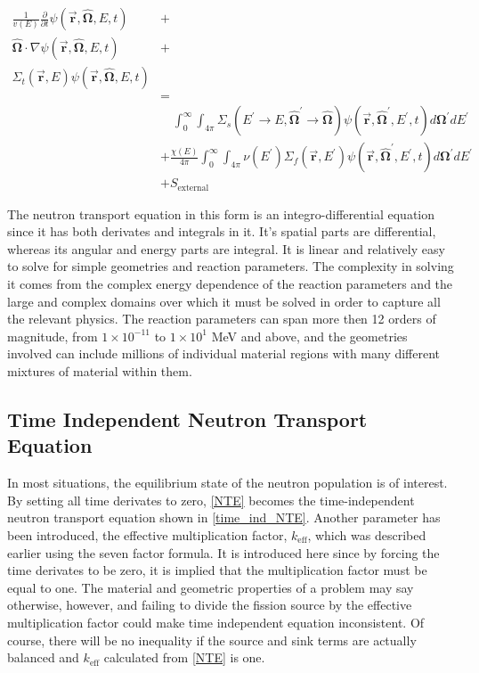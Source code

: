 \begin{equation}
\label{NTE}
\begin{split}
\frac{1}{v(E)} \frac{\partial }{\partial t}\psi(\boldsymbol{\vec{r}},\boldsymbol{\hat{\Omega}},E,t) &+  \\
\boldsymbol{\hat{\Omega}}  \cdot \nabla \psi(\boldsymbol{\vec{r}},\boldsymbol{\hat{\Omega}},E,t) &+ \\
\Sigma_t(\boldsymbol{\vec{r}},E) \psi(\boldsymbol{\vec{r}},\boldsymbol{\hat{\Omega}},E,t) & \\
& =  \\
& \quad \int_0^\infty  \int_{4\pi} \Sigma_s(E^\prime \rightarrow E,\boldsymbol{\hat{\Omega}}^\prime \rightarrow \boldsymbol{\hat{\Omega}}) \psi(\boldsymbol{\vec{r}},\boldsymbol{\hat{\Omega}}^\prime,E^\prime,t) d\boldsymbol{\Omega}^\prime dE^\prime  \\
&+ \frac{\chi(E)}{4\pi} \int_0^\infty  \int_{4\pi}   \nu(E^\prime) \Sigma_f(\boldsymbol{\vec{r}},E^\prime) \psi(\boldsymbol{\vec{r}},\boldsymbol{\hat{\Omega}}^\prime,E^\prime,t) d\boldsymbol{\Omega}^\prime  dE^\prime\\
& + S_{\mathrm{external}}
\end{split}
 \end{equation}
 
 The neutron transport equation in this form is an integro-differential equation since it has both derivates and integrals in it.  It's spatial parts are differential, whereas its angular and energy parts are integral.  It is linear and relatively easy to solve for simple geometries and reaction parameters.  The complexity in solving it comes from the complex energy dependence of the reaction parameters and the large and complex domains over which it must be solved in order to capture all the relevant physics.  The reaction parameters can span more then 12 orders of magnitude, from $1\times 10 ^{-11}$ to $1\times 10 ^{1}$ MeV and above, and the geometries involved can include millions of individual material regions with many different mixtures of material within them.
 
 \subsection{Time Independent Neutron Transport Equation}

In most situations, the equilibrium state of the neutron population is of interest.  By setting all time derivates to zero, \eqref{NTE} becomes the time-independent neutron transport equation shown in \eqref{time_ind_NTE}.  Another parameter has been introduced, the effective multiplication factor, $k_\mathrm{eff}$, which was described earlier using the seven factor formula.  It is introduced here since by forcing the time derivates to be zero, it is implied that the multiplication factor must be equal to one.  The material and geometric properties of a problem may say otherwise, however, and failing to divide the fission source by the effective multiplication factor could make time independent equation inconsistent.  Of course, there will be no inequality if the source and sink terms are actually balanced and $k_\mathrm{eff}$ calculated from \eqref{NTE} is one.

